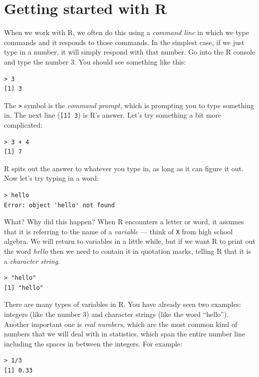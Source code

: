 \documentclass[12pt,]{book}
\begin{document}
\hypertarget{getting-started-with-r}{%
\section{Getting started with R}\label{getting-started-with-r}}

When we work with R, we often do this using a \emph{command line} in which we type commands and it responds to those commands. In the simplest case, if we just type in a number, it will simply respond with that number. Go into the R console and type the number 3. You should see something like this:

\begin{verbatim}
> 3
[1] 3
\end{verbatim}

The \texttt{\textgreater{}} symbol is the \emph{command prompt}, which is prompting you to type something in. The next line (\texttt{{[}1{]}\ 3}) is R's answer. Let's try something a bit more complicated:

\begin{verbatim}
> 3 + 4
[1] 7
\end{verbatim}

R spits out the answer to whatever you type in, as long as it can figure it out. Now let's try typing in a word:

\begin{verbatim}
> hello
Error: object 'hello' not found
\end{verbatim}

What? Why did this happen? When R encounters a letter or word, it assumes that it is referring to the name of a \emph{variable} --- think of \texttt{X} from high school algebra. We will return to variables in a little while, but if we want R to print out the word \emph{hello} then we need to contain it in quotation marks, telling R that it is a \emph{character string}.

\begin{verbatim}
> "hello"
[1] "hello"
\end{verbatim}

There are many types of variables in R. You have already seen two examples: integers (like the number 3) and character strings (like the word ``hello''). Another important one is \emph{real numbers}, which are the most common kind of numbers that we will deal with in statistics, which span the entire number line including the spaces in between the integers. For example:

\begin{verbatim}
> 1/3
[1] 0.33
\end{verbatim}
\end{document}
